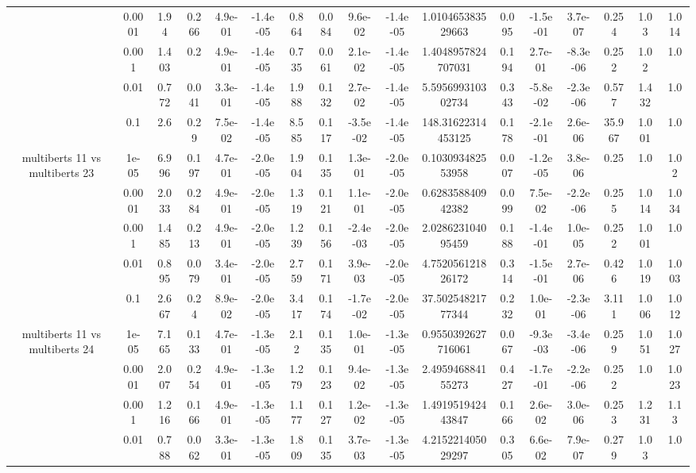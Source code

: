 \begin{tabular}{|c|c|c|c|c|c|c|c|c|c|c|c|c|c|c|c|c|}
 & 0.0001 & 1.94 & 0.266 & 4.9e-01 & -1.4e-05 & 0.864 & 0.084 & 9.6e-02 & -1.4e-05 & 1.010465383529663 & 0.095 & -1.5e-01 & 3.7e-07 & 0.254 & 1.03 & 1.014 \\
 & 0.001 & 1.403 & 0.2 & 4.9e-01 & -1.4e-05 & 0.735 & 0.061 & 2.1e-02 & -1.4e-05 & 1.4048957824707031 & 0.194 & 2.7e-01 & -8.3e-06 & 0.252 & 1.02 & 1.0 \\
 & 0.01 & 0.772 & 0.041 & 3.3e-01 & -1.4e-05 & 1.988 & 0.132 & 2.7e-02 & -1.4e-05 & 5.595699310302734 & 0.343 & -5.8e-02 & -2.3e-06 & 0.577 & 1.432 & 1.0 \\
 & 0.1 & 2.6 & 0.29 & 7.5e-02 & -1.4e-05 & 8.585 & 0.117 & -3.5e-02 & -1.4e-05 & 148.31622314453125 & 0.178 & -2.1e-01 & 2.6e-06 & 35.967 & 1.001 & 1.0 \\
\hline
\multirow{5}{*}{multiberts 11 vs multiberts 23} & 1e-05 & 6.996 & 0.197 & 4.7e-01 & -2.0e-05 & 1.904 & 0.135 & 1.3e-01 & -2.0e-05 & 0.103093482553958 & 0.007 & -1.2e-05 & 3.8e-06 & 0.25 & 1.0 & 1.02 \\
 & 0.0001 & 2.033 & 0.284 & 4.9e-01 & -2.0e-05 & 1.319 & 0.121 & 1.1e-01 & -2.0e-05 & 0.628358840942382 & 0.099 & 7.5e-02 & -2.2e-06 & 0.255 & 1.014 & 1.034 \\
 & 0.001 & 1.485 & 0.213 & 4.9e-01 & -2.0e-05 & 1.239 & 0.156 & -2.4e-03 & -2.0e-05 & 2.028623104095459 & 0.188 & -1.4e-01 & 1.0e-05 & 0.252 & 1.001 & 1.0 \\
 & 0.01 & 0.895 & 0.079 & 3.4e-01 & -2.0e-05 & 2.759 & 0.171 & 3.9e-03 & -2.0e-05 & 4.752056121826172 & 0.314 & -1.5e-01 & 2.7e-06 & 0.426 & 1.019 & 1.003 \\
 & 0.1 & 2.667 & 0.24 & 8.9e-02 & -2.0e-05 & 3.417 & 0.174 & -1.7e-02 & -2.0e-05 & 37.50254821777344 & 0.232 & 1.0e-01 & -2.3e-06 & 3.111 & 1.006 & 1.012 \\
\hline
\multirow{5}{*}{multiberts 11 vs multiberts 24} & 1e-05 & 7.165 & 0.133 & 4.7e-01 & -1.3e-05 & 2.12 & 0.135 & 1.0e-01 & -1.3e-05 & 0.9550392627716061 & 0.067 & -9.3e-03 & -3.4e-06 & 0.259 & 1.051 & 1.027 \\
 & 0.0001 & 2.007 & 0.254 & 4.9e-01 & -1.3e-05 & 1.279 & 0.123 & 9.4e-02 & -1.3e-05 & 2.495946884155273 & 0.427 & -1.7e-01 & -2.2e-06 & 0.252 & 1.0 & 1.023 \\
 & 0.001 & 1.216 & 0.166 & 4.9e-01 & -1.3e-05 & 1.177 & 0.127 & 1.2e-02 & -1.3e-05 & 1.491951942443847 & 0.166 & 2.6e-02 & 3.0e-06 & 0.253 & 1.231 & 1.13 \\
 & 0.01 & 0.788 & 0.062 & 3.3e-01 & -1.3e-05 & 1.809 & 0.135 & 3.7e-03 & -1.3e-05 & 4.215221405029297 & 0.305 & 6.6e-02 & 7.9e-07 & 0.279 & 1.03 & 1.0 \\

\end{tabular}
